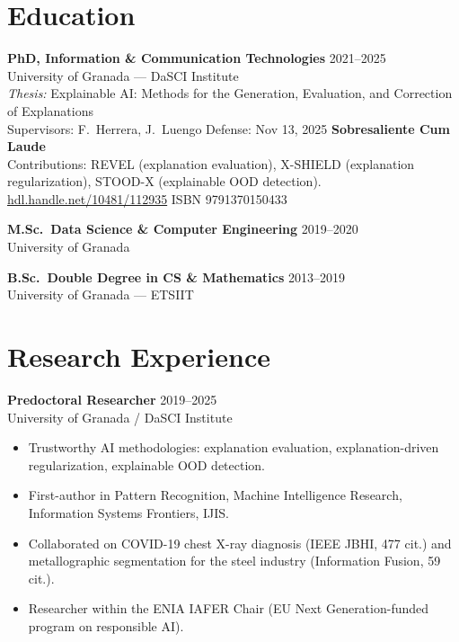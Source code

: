 \documentclass[10pt,a4paper]{article}
\begin{document}
\begin{minipage}[t]{0.64\textwidth}

\section*{Education}

\textbf{PhD, Information \& Communication Technologies} \hfill 2021--2025 \\
\textcolor{subtle}{\footnotesize University of Granada --- DaSCI Institute} \\
\textit{Thesis:} Explainable AI: Methods for the Generation, Evaluation, and Correction of Explanations \\
\textcolor{subtle}{\footnotesize Supervisors: F.~Herrera, J.~Luengo \quad Defense: Nov 13, 2025 \quad \textbf{Sobresaliente Cum Laude}} \\
\textcolor{subtle}{\footnotesize Contributions: REVEL (explanation evaluation), X-SHIELD (explanation regularization), STOOD-X (explainable OOD detection).} \\
\textcolor{subtle}{\footnotesize \href{https://hdl.handle.net/10481/112935}{hdl.handle.net/10481/112935} \quad ISBN 9791370150433}

\vspace{0.2em}

\textbf{M.Sc.~Data Science \& Computer Engineering} \hfill 2019--2020 \\
\textcolor{subtle}{\footnotesize University of Granada}

\vspace{0.2em}

\textbf{B.Sc.~Double Degree in CS \& Mathematics} \hfill 2013--2019 \\
\textcolor{subtle}{\footnotesize University of Granada --- ETSIIT}

\vspace{0.3em}

\section*{Research Experience}

\textbf{Predoctoral Researcher} \hfill 2019--2025 \\
\textcolor{subtle}{\footnotesize University of Granada / DaSCI Institute}
\begin{itemize}
    \item Trustworthy AI methodologies: explanation evaluation, explanation-driven regularization, explainable OOD detection.
    \item First-author in Pattern Recognition, Machine Intelligence Research, Information Systems Frontiers, IJIS.
    \item Collaborated on COVID-19 chest X-ray diagnosis (IEEE JBHI, 477 cit.) and metallographic segmentation for the steel industry (Information Fusion, 59 cit.).
    \item Researcher within the ENIA IAFER Chair (EU Next Generation-funded program on responsible AI).
\end{itemize}


\end{minipage}
\end{document}
